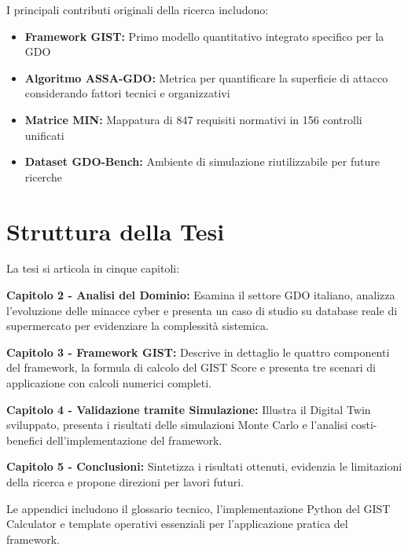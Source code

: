 \documentclass[12pt,a4paper,twoside]{book}
\begin{document}
I principali contributi originali della ricerca includono:

\begin{itemize}
\item \textbf{Framework GIST:} Primo modello quantitativo integrato specifico per la GDO
\item \textbf{Algoritmo ASSA-GDO:} Metrica per quantificare la superficie di attacco considerando fattori tecnici e organizzativi
\item \textbf{Matrice MIN:} Mappatura di 847 requisiti normativi in 156 controlli unificati
\item \textbf{Dataset GDO-Bench:} Ambiente di simulazione riutilizzabile per future ricerche
\end{itemize}

\section{Struttura della Tesi}
\label{sec:struttura}

La tesi si articola in cinque capitoli:

\textbf{Capitolo 2 - Analisi del Dominio:} Esamina il settore GDO italiano, analizza l'evoluzione delle minacce cyber e presenta un caso di studio su database reale di supermercato per evidenziare la complessità sistemica.

\textbf{Capitolo 3 - Framework GIST:} Descrive in dettaglio le quattro componenti del framework, la formula di calcolo del GIST Score e presenta tre scenari di applicazione con calcoli numerici completi.

\textbf{Capitolo 4 - Validazione tramite Simulazione:} Illustra il Digital Twin sviluppato, presenta i risultati delle simulazioni Monte Carlo e l'analisi costi-benefici dell'implementazione del framework.

\textbf{Capitolo 5 - Conclusioni:} Sintetizza i risultati ottenuti, evidenzia le limitazioni della ricerca e propone direzioni per lavori futuri.

Le appendici includono il glossario tecnico, l'implementazione Python del GIST Calculator e template operativi essenziali per l'applicazione pratica del framework.
\end{document}
